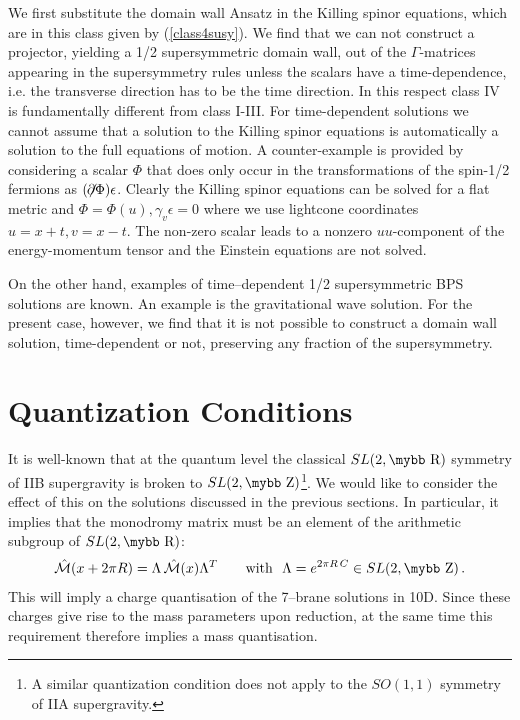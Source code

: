 \documentclass[12pt,a4paper]{article}
\def\bb#1{\hbox{\mybb#1}}
\begin{document}
We first substitute the domain wall Ansatz in the Killing spinor
equations, which are in this class given by (\ref{class4susy}). We
find that we can not construct a projector, yielding a 1/2
supersymmetric domain wall, out of the $\Gamma$-matrices appearing
in the supersymmetry rules unless the scalars have a
time-dependence, i.e. the transverse direction has to be the time
direction. In this respect class IV is fundamentally different from
class I-III. For time-dependent solutions we cannot assume that a
solution to the Killing spinor equations is automatically a
solution to the full equations of motion. A counter-example is
provided by considering a scalar $\Phi$ that does only occur in
the transformations of the spin-1/2 fermions as $(\not \!\! \partial
\Phi)\epsilon$. Clearly the Killing spinor equations can be solved
for a flat metric and $\Phi = \Phi(u), \gamma_v\epsilon = 0$ where
we use lightcone coordinates $u = x+t, v = x-t$. The non-zero
scalar leads to a nonzero $uu$-component of the energy-momentum
tensor and the Einstein equations are not solved.

On the other hand, examples of time--dependent 1/2 supersymmetric
BPS solutions are known. An example is the gravitational wave
solution. For the present case, however, we find that it is not
possible to construct a domain wall solution, time-dependent or
not, preserving any fraction of the supersymmetry.


\section{Quantization Conditions}

It is well-known that at the quantum level
the classical $SL(2,\bb{R})$ symmetry of IIB supergravity is broken
to $SL(2,\bb{Z})$\footnote{A similar quantization condition
does not apply to the $SO(1,1)$ symmetry of IIA supergravity.}.
We would like to consider the
effect of this on the solutions discussed in the previous sections.
In particular, it implies that the monodromy matrix must be an element of
the arithmetic subgroup of $SL(2,\bb{R})$:
\begin{align}
  \hat{\mathcal M} (x+2\pi R) = \Lambda \, \hat{\mathcal{M}}(x) \Lambda^T
  \qquad \text{with~~} \Lambda = e^{2 \pi R \, C} \in SL(2,\bb{Z}) \,.
\label{quantcond}
\end{align}
This will imply a charge quantisation of the 7--brane solutions in 10D.
Since these charges give rise to the mass parameters upon reduction,
at the same time this requirement therefore implies a mass quantisation.
\end{document}
